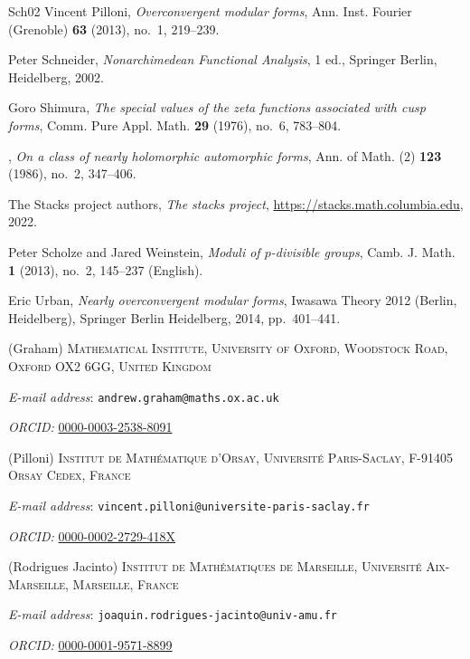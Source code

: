 \documentclass[10pt, oneside]{amsart}
\makeatletter
\numberwithin{equation}{subsection}
\theoremstyle{definition}
\theoremstyle{remark}
\newcommand{\Addresses}{{%
  \bigskip
  \footnotesize

  (Graham) \textsc{Mathematical Institute, University of Oxford, Woodstock Road, Oxford OX2 6GG, United Kingdom}\par\nopagebreak
  \textit{E-mail address}: \texttt{andrew.graham@maths.ox.ac.uk}\par\nopagebreak
  \textit{ORCID:} \href{https://orcid.org/0000-0003-2538-8091}{0000-0003-2538-8091}

  \medskip 

  (Pilloni) \textsc{Institut de Math\'{e}matique d'Orsay, Universit\'{e} Paris-Saclay, F-91405 Orsay Cedex, France}\par\nopagebreak
  \textit{E-mail address}: \texttt{vincent.pilloni@universite-paris-saclay.fr}\par\nopagebreak
  \textit{ORCID:} \href{https://orcid.org/0000-0002-2729-418X}{0000-0002-2729-418X}

  \medskip

  (Rodrigues Jacinto) \textsc{Institut de Mathématiques de Marseille, Université Aix-Marseille, Marseille, France}\par\nopagebreak
  \textit{E-mail address}: \texttt{joaquin.rodrigues-jacinto@univ-amu.fr}\par\nopagebreak
  \textit{ORCID:} \href{https://orcid.org/0000-0001-9571-8899}{0000-0001-9571-8899}


}}
\makeatother
\begin{document}
\begin{thebibliography}{{Sch}02}
Vincent Pilloni, \emph{Overconvergent modular forms}, Ann. Inst. Fourier
  (Grenoble) \textbf{63} (2013), no.~1, 219--239.

Peter {Schneider}, \emph{{N}onarchimedean {F}unctional {A}nalysis}, 1 ed.,
  Springer Berlin, Heidelberg, 2002.

Goro Shimura, \emph{The special values of the zeta functions associated with
  cusp forms}, Comm. Pure Appl. Math. \textbf{29} (1976), no.~6, 783--804.

\bysame, \emph{On a class of nearly holomorphic automorphic forms}, Ann. of
  Math. (2) \textbf{123} (1986), no.~2, 347--406.

The {Stacks project authors}, \emph{The stacks project},
  \url{https://stacks.math.columbia.edu}, 2022.

Peter Scholze and Jared Weinstein, \emph{Moduli of {{\(p\)}}-divisible groups},
  Camb. J. Math. \textbf{1} (2013), no.~2, 145--237 (English).

Eric Urban, \emph{Nearly overconvergent modular forms}, Iwasawa Theory 2012
  (Berlin, Heidelberg), Springer Berlin Heidelberg, 2014, pp.~401--441.

\end{thebibliography}


\Addresses
\end{document}
